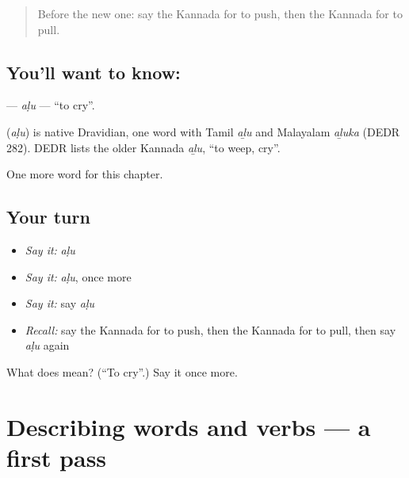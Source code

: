 \label{lesson:KA-C153-alu}



\begin{quote}
Before the new one: say the Kannada for to push, then the Kannada for to pull.
\end{quote}

\subsection*{You'll want to know: }
\textbf{} — \emph{aḷu} — \textquotedblleft{}to cry\textquotedblright{}.

\begin{cousinweb}
\textbf{} (\emph{aḷu}) is native Dravidian, one word with Tamil \emph{aḻu} and Malayalam \emph{aḻuka} (DEDR 282). DEDR lists the older Kannada \emph{aḻu}, \textquotedblleft{}to weep, cry\textquotedblright{}.
\end{cousinweb}

\begin{grammarlens}[title={What you've built}]
One more word for this chapter.
\end{grammarlens}

\subsection*{Your turn}
\begin{itemize}
\raggedright
  \item \emph{Say it:} \emph{aḷu}
  \item \emph{Say it:} \emph{aḷu}, once more
  \item \emph{Say it:} say \emph{aḷu}
  \item \emph{Recall:} say the Kannada for to push, then the Kannada for to pull, then say \emph{aḷu} again
\end{itemize}

\begin{tcolorbox}[breakable,colback=teal!4,colframe=teal!35!black,title={Before you move on}]
What does  mean? (\textquotedblleft{}To cry\textquotedblright{}.) Say it once more.
\end{tcolorbox}
\section[(dialogue)]{Describing words and verbs — a first pass}

\label{lesson:KA-R153-first-pass-describing-words-and-verbs}



